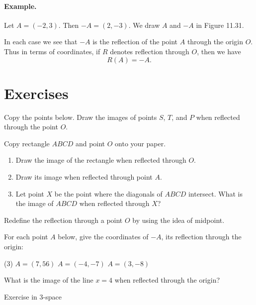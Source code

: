 \documentclass[12pt]{book} %
\begin{document}
\begin{ExerciseList}

\paragraph{Example.}
Let $A=(-2,3)$. Then $-A=(2,-3)$. We draw $A$ and $-A$ in Figure 11.31.


In each case we see that $-A$ is the reflection of the point $A$ through the origin $O$. Thus in terms of coordinates, if $R$ denotes reflection through $O$, then we have
\[
R(A)=-A.
\]

\section*{Exercises}

\setcounter{Exercise}{0}
\begin{ExerciseList}
\Exercise Copy the points below. Draw the images of points $S$, $T$, and $P$ when reflected through the point $O$.


\Exercise Copy rectangle $ABCD$ and point $O$ onto your paper.
\begin{enumerate}
\item[(a)] Draw the image of the rectangle when reflected through $O$.


\item[(b)] Draw its image when reflected through point $A$.

\item[(c)] Let point $X$ be the point where the diagonals of $ABCD$ intersect. What is the image of $ABCD$ when reflected through $X$?
\end{enumerate}

\Exercise Redefine the reflection through a point $O$ by using the idea of midpoint.

\Exercise For each point $A$ below, give the coordinates of $-A$, its reflection through the origin:
\begin{tasks}(3)
\task[(a)] $A=(7,56)$
\task[(b)] $A=(-4,-7)$
\task[(c)] $A=(3,-8)$
\end{tasks}

\Exercise What is the image of the line $x=4$ when reflected through the origin?

\Exercise Exercise in 3-space


\end{ExerciseList}
\end{ExerciseList}
\end{document}
